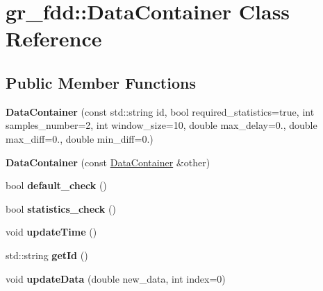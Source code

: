 \hypertarget{classgr__fdd_1_1DataContainer}{}\section{gr\+\_\+fdd\+:\+:Data\+Container Class Reference}
\label{classgr__fdd_1_1DataContainer}
\subsection*{Public Member Functions}
\begin{DoxyCompactItemize}
\item 
\mbox{\label{classgr__fdd_1_1DataContainer_a20bea53b0bdedc59015d9446b0896909}} 
{\bfseries Data\+Container} (const std\+::string id, bool required\+\_\+statistics=true, int samples\+\_\+number=2, int window\+\_\+size=10, double max\+\_\+delay=0., double max\+\_\+diff=0., double min\+\_\+diff=0.)
\item 
\mbox{\label{classgr__fdd_1_1DataContainer_a816a850d24550593e16ce593766e5ba2}} 
{\bfseries Data\+Container} (const \hyperlink{classgr__fdd_1_1DataContainer}{Data\+Container} \&other)
\item 
\mbox{\label{classgr__fdd_1_1DataContainer_a302168dd9cefea8a73f17238d9f1913b}} 
bool {\bfseries default\+\_\+check} ()
\item 
\mbox{\label{classgr__fdd_1_1DataContainer_adab5705d67f19bdb358404376662b13f}} 
bool {\bfseries statistics\+\_\+check} ()
\item 
\mbox{\label{classgr__fdd_1_1DataContainer_a7f2f951f77c20fbf76dced47d43295b1}} 
void {\bfseries update\+Time} ()
\item 
\mbox{\label{classgr__fdd_1_1DataContainer_a2d14a2b9eacfe1bc3a37813b6e79854e}} 
std\+::string {\bfseries get\+Id} ()
\item 
\mbox{\label{classgr__fdd_1_1DataContainer_a1c55eba2a4ca1691a70906ecb5d30c7f}} 
void {\bfseries update\+Data} (double new\+\_\+data, int index=0)

\end{DoxyCompactItemize}
